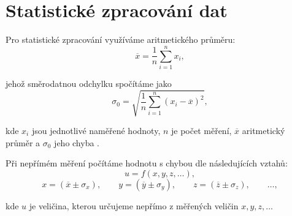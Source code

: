 \documentclass[english]{article}
\begin{document}
\section{Statistické zpracování dat}
	Pro statistické zpracování využíváme aritmetického průměru:
	\begin{equation} \label{eq:aritmeticky_prumer}
	\overline{x} = \frac{1}{n}\sum\limits_{i=1}^{n}x_i,
	\end{equation}

	jehož směrodatnou odchylku spočítáme jako 
	\begin{equation} \label{eq:smodch_aritmetickeho_prumeru}
	\sigma_0 = \sqrt{\frac{1}{n} \sum\limits_{i=1}^{n}\left( x_i - \overline{x} \right)^2 },
	\end{equation}
	
	kde $ x_i $ jsou jednotlivé naměřené hodnoty, $ n $ je počet měření, $ \overline{x} $ aritmetický průměr a $ \sigma_0 $ jeho chyba \cite{bib:chyby}.
	
	
%	
%	
Při nepřímém měření počítáme hodnotu s chybou dle následujících vztahů:
	\begin{equation}
	u = f(x, y, z, \ldots),
	\end{equation}
	\begin{displaymath}
	x = (\overline{x} \pm \sigma_x), \qquad
	y = (\overline{y} \pm \sigma_y), \qquad
	z = (\overline{z} \pm \sigma_z), \qquad
	\ldots,
	\end{displaymath}
	
	kde $ u $ je veličina, kterou určujeme nepřímo z měřených veličin $ x, y, z, \ldots $ 
	
\end{document}

